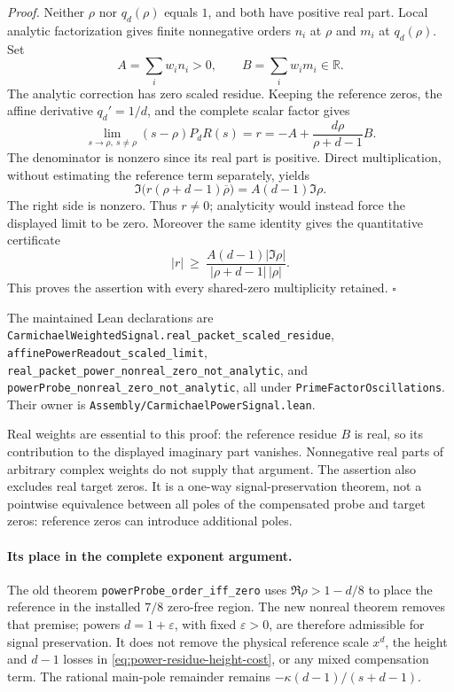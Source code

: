 \emph{Proof.}
Neither \(\rho\) nor \(q_d(\rho)\) equals \(1\), and both have positive
real part. Local analytic factorization gives finite nonnegative
orders \(n_i\) at \(\rho\) and \(m_i\) at \(q_d(\rho)\).
Set
\[
 A=\sum_iw_i n_i>0,\qquad B=\sum_iw_i m_i\in\mathbb R.
\]
The analytic correction has zero scaled residue. Keeping the reference
zeros, the affine derivative \(q_d'=1/d\), and the complete scalar
factor gives
\[
 \lim_{s\to\rho,\ s\ne\rho}(s-\rho)P_dR(s)
   =r=-A+\frac{d\rho}{\rho+d-1}B.
\]
The denominator is nonzero since its real part is positive. Direct
multiplication, without estimating the reference term separately, yields
\[
 \Im\bigl(r(\rho+d-1)\overline{\rho}\bigr)
       =A(d-1)\Im\rho.
\]
The right side is nonzero. Thus \(r\ne0\); analyticity would instead
force the displayed limit to be zero. Moreover the same identity gives
the quantitative certificate
\begin{equation}\label{eq:power-residue-height-cost}
 |r|\ \ge\
 \frac{A(d-1)|\Im\rho|}{|\rho+d-1|\,|\rho|}.
\end{equation}
This proves the assertion with every shared-zero multiplicity retained.
\(\square\)

The maintained Lean declarations are
\texttt{CarmichaelWeightedSignal.real\_packet\_scaled\_residue},
\texttt{affinePowerReadout\_scaled\_limit},
\texttt{real\_packet\_power\_nonreal\_zero\_not\_analytic}, and
\texttt{powerProbe\_nonreal\_zero\_not\_analytic}, all under
\texttt{PrimeFactorOscillations}. Their owner is
\texttt{Assembly/CarmichaelPowerSignal.lean}.

Real weights are essential to this proof: the reference residue \(B\)
is real, so its contribution to the displayed imaginary part vanishes.
Nonnegative real parts of arbitrary complex weights do not supply that
argument. The assertion also excludes real target zeros. It is a
one-way signal-preservation theorem, not a pointwise equivalence between
all poles of the compensated probe and target zeros: reference zeros
can introduce additional poles.

\paragraph{Its place in the complete exponent argument.}
The old theorem \texttt{powerProbe\_order\_iff\_zero} uses
\(\Re\rho>1-d/8\) to place the reference in the installed
\(7/8\) zero-free region. The new nonreal theorem removes that premise;
powers \(d=1+\varepsilon\), with fixed \(\varepsilon>0\), are therefore
admissible for signal preservation. It does not remove the physical
reference scale \(x^d\), the height and \(d-1\) losses in
\eqref{eq:power-residue-height-cost}, or any mixed compensation term.
The rational main-pole remainder remains
\(-\kappa(d-1)/(s+d-1)\).

